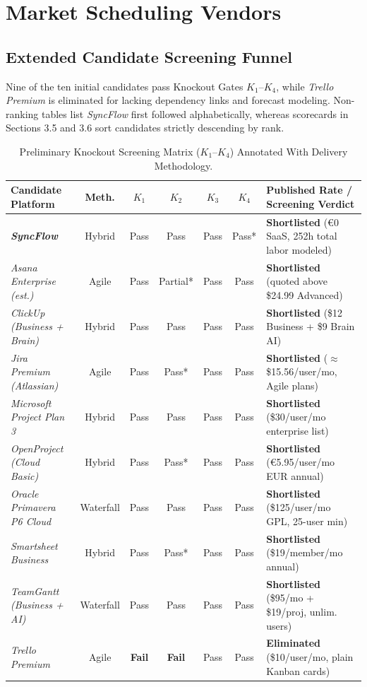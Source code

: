 \chapter{Market Scheduling Vendors}
\section{Extended Candidate Screening Funnel}
Nine of the ten initial candidates pass Knockout Gates $K_1$--$K_4$, while \textit{Trello Premium} is eliminated for lacking dependency links and forecast modeling. Non-ranking tables list \textit{SyncFlow} first followed alphabetically, whereas scorecards in Sections 3.5 and 3.6 sort candidates strictly descending by rank.

\begin{table}[H]
\centering
\scriptsize
\setlength{\tabcolsep}{2.4pt}
\renewcommand{\arraystretch}{1.18}
\caption*{Preliminary Knockout Screening Matrix ($K_1$--$K_4$) Annotated With Delivery Methodology.}
\begin{tabularx}{\textwidth}{>{\raggedright\arraybackslash}p{4.05cm} c c c c c >{\raggedright\arraybackslash}X}
\toprule
\textbf{Candidate Platform} & \textbf{Meth.} & \textbf{$K_1$} & \textbf{$K_2$} & \textbf{$K_3$} & \textbf{$K_4$} & \textbf{Published Rate / Screening Verdict} \\
\midrule
\textbf{\textit{SyncFlow}} & Hybrid & Pass & Pass & Pass & Pass* & \textbf{Shortlisted} (€0 SaaS, 252h total labor modeled) \\
\textit{Asana Enterprise (est.)} \cite{asana} & Agile & Pass & Partial* & Pass & Pass & \textbf{Shortlisted} (quoted above \$24.99 Advanced) \\
\textit{ClickUp (Business + Brain)} \cite{clickup} & Hybrid & Pass & Pass & Pass & Pass & \textbf{Shortlisted} (\$12 Business + \$9 Brain AI) \\
\textit{Jira Premium (Atlassian)} \cite{jira} & Agile & Pass & Pass* & Pass & Pass & \textbf{Shortlisted} ($\approx$ \$15.56/user/mo, Agile plans) \\
\textit{Microsoft Project Plan 3} \cite{msproject} & Hybrid & Pass & Pass & Pass & Pass & \textbf{Shortlisted} (\$30/user/mo enterprise list) \\
\textit{OpenProject (Cloud Basic)} \cite{openproject} & Hybrid & Pass & Pass* & Pass & Pass & \textbf{Shortlisted} (€5.95/user/mo EUR annual) \\
\textit{Oracle Primavera P6 Cloud} \cite{primavera} & Waterfall & Pass & Pass & Pass & Pass & \textbf{Shortlisted} (\$125/user/mo GPL, 25-user min) \\
\textit{Smartsheet Business} \cite{smartsheet} & Hybrid & Pass & Pass* & Pass & Pass & \textbf{Shortlisted} (\$19/member/mo annual) \\
\textit{TeamGantt (Business + AI)} \cite{teamgantt} & Waterfall & Pass & Pass & Pass & Pass & \textbf{Shortlisted} (\$95/mo + \$19/proj, unlim. users) \\
\textit{Trello Premium} \cite{trello} & Agile & \textbf{Fail} & \textbf{Fail} & Pass & Pass & \textbf{Eliminated} (\$10/user/mo, plain Kanban cards) \\
\bottomrule
\end{tabularx}
\end{table}

